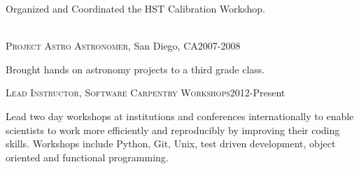 \documentclass[10pt]{cv}
\begin{document}
\begin{llist}
\begin{minipage}[l]{0.7\textwidth}
Organized and Coordinated the HST Calibration Workshop.\\
\end{minipage}\vspace{0.15cm}
\\
\textsc{Project Astro Astronomer}, San Diego, CA\hfill 2007-2008\\
\begin{minipage}[l]{0.7\textwidth}\vspace{0.15cm}
Brought hands on astronomy projects to a third grade class.\\
\end{minipage}\vspace{0.15cm}
\vspace{-0.1in}   
\textsc{Lead Instructor, Software Carpentry Workshops}\hfill 2012-Present\\
\begin{minipage}[l]{0.7\textwidth}\vspace{0.15cm}
Lead two day workshops at institutions and conferences internationally to enable scientists to work more efficiently and reproducibly by improving their coding skills. Workshops include Python, Git, Unix, test driven development, object oriented and functional programming. \\
\end{minipage}\vspace{0.15cm}

\end{llist}
\end{document}
